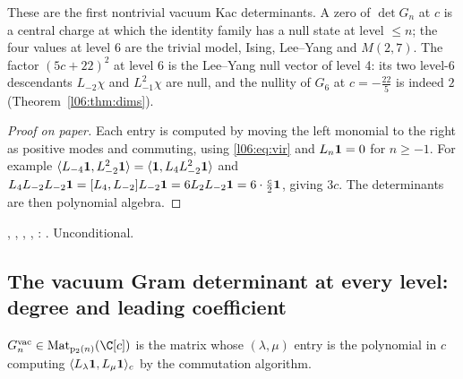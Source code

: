 \begin{physics}
These are the first nontrivial vacuum Kac determinants. A zero of $\det G_n$ at $c$ is a central charge
at which the identity family has a null state at level $\le n$; the four values at level 6 are the trivial
model, Ising, Lee--Yang and $M(2,7)$. The factor $(5c+22)^2$ at level 6 is the Lee--Yang null vector of
level 4: its two level-6 descendants $L_{-2}\chi$ and $L_{-1}^2\chi$ are null, and the nullity of $G_6$ at
$c = -\frac{22}5$ is indeed $2$ (Theorem~\ref{l06:thm:dims}).
\end{physics}

\begin{proof}[Proof on paper]
Each entry is computed by moving the left monomial to the right as positive modes and commuting, using
\eqref{l06:eq:vir} and $L_n\mathbf{1} = 0$ for $n\ge-1$. For example
$\langle L_{-4}\mathbf{1},L_{-2}^2\mathbf{1}\rangle = \langle \mathbf{1},L_4L_{-2}^2\mathbf{1}\rangle$ and
$L_4L_{-2}L_{-2}\mathbf{1} = [L_4,L_{-2}]L_{-2}\mathbf{1} = 6L_2L_{-2}\mathbf{1} = 6\cdot\frac c2\mathbf{1}$, giving
$3c$. The determinants are then polynomial algebra.
\end{proof}

\begin{status}
\allowbreak{}\allowbreak{}\allowbreak{}, , \allowbreak{}\allowbreak{}\allowbreak{},
, \allowbreak{}\allowbreak{}\allowbreak{}\allowbreak{}: \lean{[propext, Classical.}\allowbreak{}\allowbreak\lean{sound]}.
Unconditional.
\end{status}

\subsection{The vacuum Gram determinant at every level: degree and leading coefficient}

\begin{definition}\label{l06:def:partgram}
$G^{\mathrm{vac}}_n\in\mathrm{Mat}_{\lsixpt(n)}(\C[c])$ is the matrix whose $(\lambda,\mu)$ entry is the
polynomial in $c$ computing $\langle L_\lambda\mathbf{1},L_\mu\mathbf{1}\rangle_c$ by the commutation algorithm.
\end{definition}

